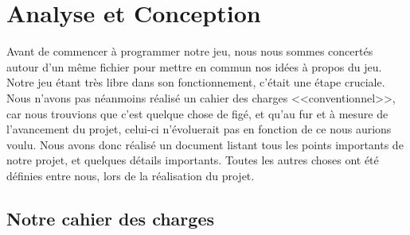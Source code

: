 \documentclass[11pt]{report}
\begin{document}
\chapter{Analyse et Conception}

	Avant de commencer à programmer notre jeu, nous nous sommes concertés autour d'un même fichier pour mettre en commun nos idées à propos du jeu. Notre jeu étant très libre dans son fonctionnement, c'était une étape cruciale.\\
	Nous n'avons pas néanmoins réalisé un cahier des charges <<conventionnel>>, car nous trouvions que c'est quelque chose de figé, et qu'au fur et à mesure de l'avancement du projet, celui-ci n'évoluerait pas en fonction de ce nous aurions voulu. Nous avons donc réalisé un document listant tous les points importants de notre projet, et quelques détails importants. Toutes les autres choses ont été définies entre nous, lors de la réalisation du projet.

	\section{Notre cahier des charges}
\end{document}

